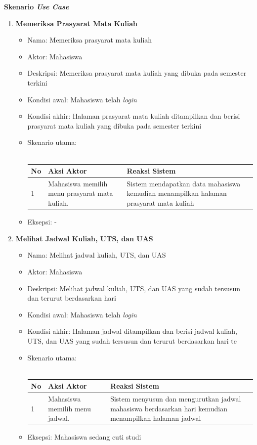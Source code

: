 \documentclass[a4paper,twoside]{article}
\begin{document}
\begin{enumerate}
\begin{enumerate}
\textbf{Skenario \textit{Use Case}}\\

\begin{enumerate}
	\item \textbf{Memeriksa Prasyarat Mata Kuliah}
		\begin{itemize}
			\item Nama: Memeriksa prasyarat mata kuliah
			\item Aktor: Mahasiswa
			\item Deskripsi: Memeriksa prasyarat mata kuliah yang dibuka pada semester terkini
			\item Kondisi awal: Mahasiswa telah \textit{login}
			\item Kondisi akhir: Halaman prasyarat mata kuliah ditampilkan dan berisi prasyarat mata kuliah yang dibuka pada semester terkini
			\item Skenario utama: \\ \\
				\begin{tabular}{|p{0.5cm} |p{6cm}| p{6cm}|}
						\hline
							No 	& Aksi Aktor & Reaksi Sistem \\ \hline
							1 	& Mahasiswa memilih menu prasyarat mata kuliah. 	&	Sistem mendapatkan data mahasiswa kemudian menampilkan halaman prasyarat mata kuliah \\ \hline 
						\end{tabular} 
			\item Eksepsi: -
		\end{itemize}
		
	\item \textbf{Melihat Jadwal Kuliah, UTS, dan UAS}
		\begin{itemize}
			\item Nama: Melihat jadwal kuliah, UTS, dan UAS
			\item Aktor: Mahasiswa
			\item Deskripsi: Melihat jadwal kuliah, UTS, dan UAS yang sudah tersusun dan terurut berdasarkan hari
			\item Kondisi awal: Mahasiswa telah \textit{login}
			\item Kondisi akhir: Halaman jadwal ditampilkan dan berisi jadwal kuliah, UTS, dan UAS yang sudah tersusun dan terurut berdasarkan hari te
			\item Skenario utama: \\ \\
				\begin{tabular}{|p{0.5cm} |p{6cm}| p{6cm}|}
						\hline
							No 	& Aksi Aktor & Reaksi Sistem \\ \hline
							1 	& Mahasiswa memilih menu jadwal. 	&	Sistem menyusun dan mengurutkan jadwal mahasiswa berdasarkan hari kemudian menampilkan halaman jadwal \\ \hline 
						\end{tabular} 
			\item Eksepsi: Mahasiswa sedang cuti studi
		\end{itemize}
		

\end{enumerate}
\end{enumerate}
\end{enumerate}
\end{document}
